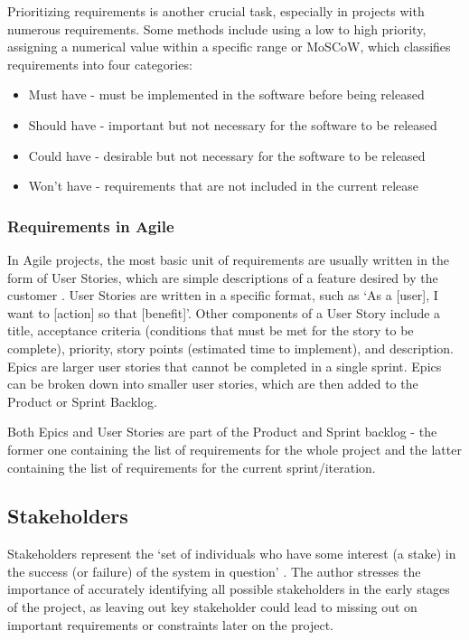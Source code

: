 Prioritizing requirements is another crucial task, especially in projects with numerous requirements. Some methods include using a low to high priority, assigning a numerical value within a specific range or MoSCoW, which classifies requirements into four categories: 
\begin{itemize}
    \item Must have - must be implemented in the software before being released
    \item Should have - important but not necessary for the software to be released
    \item Could have - desirable but not necessary for the software to be released
    \item Won't have - requirements that are not included in the current release
\end{itemize}

\subsubsection{Requirements in Agile}

In Agile projects, the most basic unit of requirements are usually written in the form of User Stories, which are simple descriptions of a feature desired by the customer \parencite[191]{requirements}. User Stories are written in a specific format, such as `As a [user], I want to [action] so that [benefit]'. Other components of a User Story include a title, acceptance criteria (conditions that must be met for the story to be complete), priority, story points (estimated time to implement), and description. Epics are larger user stories that cannot be completed in a single sprint. Epics can be broken down into smaller user stories, which are then added to the Product or Sprint Backlog.

Both Epics and User Stories are part of the Product and Sprint backlog - the former one containing the list of requirements for the whole project and the latter containing the list of requirements for the current sprint/iteration.

\subsection{Stakeholders}

Stakeholders represent the `set of individuals who have some interest (a stake) in the success (or failure) of the system in question' \parencite[34]{requirements}. The author stresses the importance of accurately identifying all possible stakeholders in the early stages of the project, as leaving out key stakeholder could lead to missing out on important requirements or constraints later on the project. 

